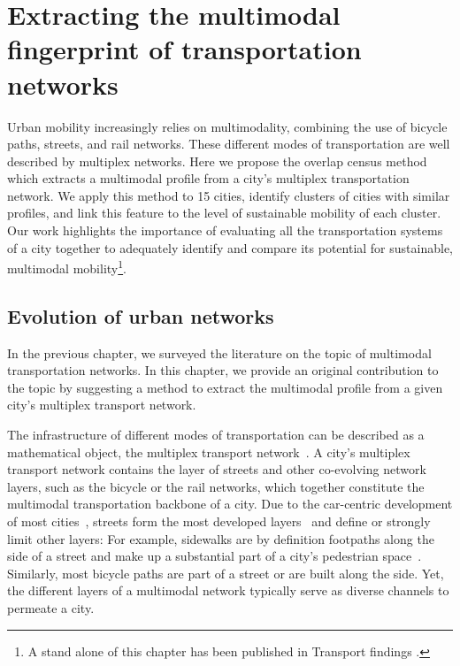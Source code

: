 \chapter{Extracting the multimodal fingerprint of transportation networks}\label{ch:OverlapCensus}

Urban mobility increasingly relies on multimodality, combining the use of bicycle paths, streets, and rail networks. These different modes of transportation are well described by multiplex networks. Here we propose the overlap census method which extracts a multimodal profile from a city's multiplex transportation network. We apply this method to 15 cities, identify clusters of cities with similar profiles, and link this feature to the level of sustainable mobility of each cluster. Our work highlights the importance of evaluating all the transportation systems of a city together to adequately identify and compare its potential for sustainable, multimodal mobility\footnote{A stand alone of this chapter has been published in Transport findings \cite{natera2020multimodal}.}.
\pagebreak

\section{Evolution of urban networks}
In the previous chapter, we surveyed the literature on the topic of multimodal transportation networks. In this chapter, we provide an original contribution to the topic by suggesting a method to extract the multimodal profile from a given city's multiplex transport network.

The infrastructure of different modes of transportation can be described as a mathematical object, the multiplex transport network~\cite{morris2012transport,strano2012evolution,Barthelemy2013Evolution,battiston2014structural,Gallotti2014Efficiency,dedomenico2014interconnected,strano2015features,Aleta2017Multilayer,Lee2017Morphology}. A city's multiplex transport network contains the layer of streets and other co-evolving network layers, such as the bicycle or the rail networks, which together constitute the multimodal transportation backbone of a city. Due to the car-centric development of most cities~\cite{Jacobs1961Death}, streets form the most developed layers~\cite{Gossling2016Space,Szell2018Crowdsourced} and define or strongly limit other layers: For example, sidewalks are by definition footpaths along the side of a street and make up a substantial part of a city's pedestrian space~\cite{Gossling2016Space}. Similarly, most bicycle paths are part of a street or are built along the side. Yet, the different layers of a multimodal network typically serve as diverse channels to permeate a city. 

